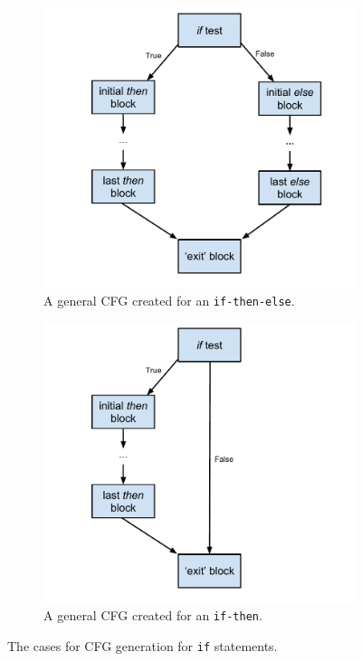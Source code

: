 \documentclass[12pt, titlepage]{article}
\begin{document}
\begin{figure}[t]
    \centering
    \begin{subfigure}[t]{0.5\textwidth}
        \centering
        \hspace*{-0.65in}
        \includegraphics[scale=0.6]{images/cfgIfthenelse.pdf}
        \caption{A general CFG created  for \newline an \texttt{if-then-else}.}
    \end{subfigure}%
    \begin{subfigure}[t]{0.5\textwidth}
        \centering
        \includegraphics[scale=0.6]{images/cfgIfthen.pdf}
        \caption{A general CFG created for an \texttt{if-then}.}
    \end{subfigure}
    \caption{The cases for CFG generation for \texttt{if} statements.}
    \label{fig:ifcfgs}
\end{figure}
\end{document}
